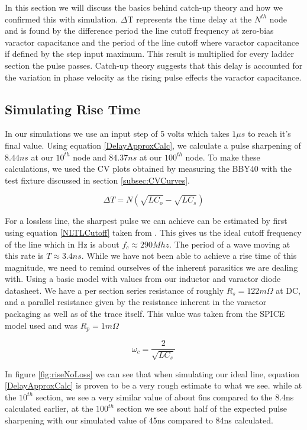 \documentclass[journal]{IEEEtran}
\begin{document}
In this section we will discuss the basics behind catch-up theory\cite{wilson1991pulse} and how we confirmed this with simulation. $\Delta$T represents the time delay at the $N^{th}$ node and is found by the difference period the line cutoff frequency at zero-bias varactor capacitance and the period of the line cutoff where varactor capacitance if defined by the step input maximum. This result is multiplied for every ladder section the pulse passes. Catch-up theory suggests that this delay is accounted for the variation in phase velocity as the rising pulse effects the varactor capacitance.

\subsection{Simulating Rise Time}

In our simulations we use an input step of 5 volts which takes $1\mu s$ to reach it's final value. Using equation \ref{DelayApproxCalc}, we calculate a pulse sharpening of $8.44ns$ at our $10^{th}$ node and $84.37ns$ at our $100^{th}$ node. To make these calculations, we used the CV plots obtained by measuring the BBY40 with the test fixture discussed in section \ref{subsec:CVCurves}.


\begin{equation} \label{DelayApproxCalc}
    \Delta T = N(\sqrt{LC_{o}} - \sqrt{LC_{s}} )
\end{equation}

For a lossless line, the sharpest pulse we can achieve can be estimated by first using equation \ref{NLTLCutoff} taken from \cite{wilson1991pulse}. This gives us the ideal cutoff frequency of the line which in Hz is about $f_c \approx 290Mhz$. The period of a wave moving at this rate is $T \approx 3.4ns$. While we have not been able to achieve a rise time of this magnitude, we need to remind ourselves of the inherent parasitics we are dealing with. Using a basic model with values from our inductor and varactor diode datasheet. We have a per section series resistance of roughly $R_s = 122m\Omega$ at DC, and a parallel resistance given by the resistance inherent in the varactor packaging as well as of the trace itself. This value was taken from the SPICE model used and was $R_{p} = 1m\Omega$

\begin{equation} \label{NLTLCutoff}
    \omega_{c} = \frac{2}{\sqrt{ LC_{s} } }
\end{equation}

In figure \ref{fig:riseNoLoss} we can see that when simulating our ideal line, equation \ref{DelayApproxCalc} is proven to be a very rough estimate to what we see. while at the $10^{th}$ section, we see a very similar value of about 6ns compared to the 8.4ns calculated earlier, at the $100^{th}$ section we see about half of the expected pulse sharpening with our simulated value of 45ns compared to 84ns calculated. 
\end{document}
